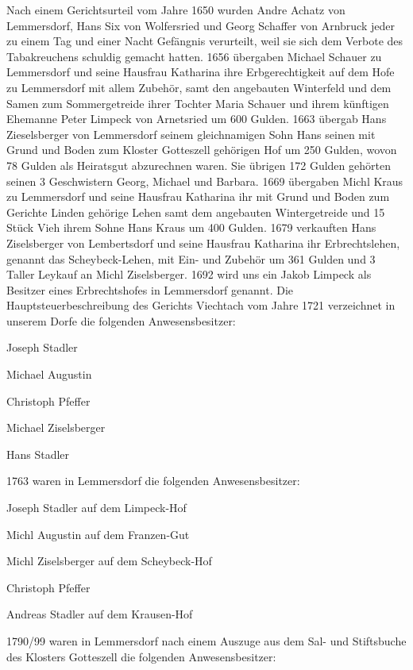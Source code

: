 \documentclass{book}
\begin{document}
Nach einem Gerichtsurteil vom Jahre 1650 wurden Andre Achatz von Lemmersdorf,
Hans Six von Wolfersried und Georg Schaffer von Arnbruck jeder zu einem Tag und
einer Nacht Gefängnis verurteilt, weil sie sich dem Verbote des Tabakreuchens
schuldig gemacht hatten. 1656 übergaben Michael Schauer zu Lemmersdorf und seine
Hausfrau Katharina ihre Erbgerechtigkeit auf dem Hofe zu Lemmersdorf mit allem
Zubehör, samt den angebauten Winterfeld und dem Samen zum Sommergetreide ihrer
Tochter Maria Schauer und ihrem künftigen Ehemanne Peter Limpeck von Arnetsried
um 600 Gulden. 1663 übergab Hans Zieselsberger von Lemmersdorf seinem
gleichnamigen Sohn Hans seinen mit Grund und Boden zum Kloster Gotteszell
gehörigen Hof um 250 Gulden, wovon 78 Gulden als Heiratsgut abzurechnen waren.
Sie übrigen 172 Gulden gehörten seinen 3 Geschwistern Georg, Michael und
Barbara. 1669 übergaben Michl Kraus zu Lemmersdorf und seine Hausfrau Katharina
ihr mit Grund und Boden zum Gerichte Linden gehörige Lehen samt dem angebauten
Wintergetreide und 15 Stück Vieh ihrem Sohne Hans Kraus um 400 Gulden. 1679
verkauften Hans Ziselsberger von Lembertsdorf und seine Hausfrau Katharina ihr
Erbrechtslehen, genannt das Scheybeck-Lehen, mit Ein- und Zubehör um 361 Gulden
und 3 Taller Leykauf an Michl Ziselsberger. 1692 wird uns ein Jakob Limpeck als
Besitzer eines Erbrechtshofes in Lemmersdorf genannt. Die
Hauptsteuerbeschreibung des Gerichts Viechtach vom Jahre 1721 verzeichnet in
unserem Dorfe die folgenden Anwesensbesitzer:



Joseph Stadler

Michael Augustin

Christoph Pfeffer

Michael Ziselsberger

Hans Stadler



1763 waren in Lemmersdorf die folgenden Anwesensbesitzer:



Joseph Stadler auf dem Limpeck-Hof

Michl Augustin auf dem Franzen-Gut

Michl Ziselsberger auf dem Scheybeck-Hof

Christoph Pfeffer

Andreas Stadler auf dem Krausen-Hof



1790/99 waren in Lemmersdorf nach einem Auszuge aus dem Sal- und Stiftsbuche des
Klosters Gotteszell die folgenden Anwesensbesitzer:
\end{document}
